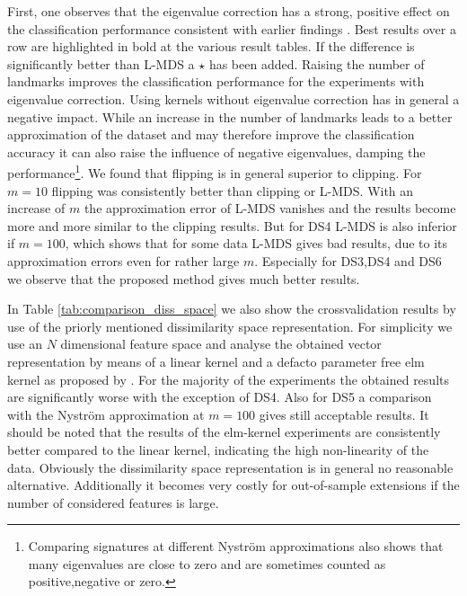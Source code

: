 \documentclass[twoside,11pt]{article}
\begin{document}
First, one observes that the eigenvalue correction has a strong, positive effect
on the classification performance consistent with earlier findings \cite{DBLP:journals/jmlr/ChenGGRC09}. 
Best results over a row are highlighted in bold at the various result tables. If the difference is significantly better than L-MDS
a $\star$ has been added. 
Raising the number of landmarks improves the classification performance for the experiments with eigenvalue correction. 
Using kernels without eigenvalue correction has in general a negative impact. While an increase in the number of landmarks leads to a better
approximation of the dataset and may therefore improve the classification accuracy it can also raise the influence of negative eigenvalues,
damping the performance\footnote{Comparing signatures at different Nystr\"om approximations also shows that many 
eigenvalues are close to zero and are sometimes counted as positive,negative or zero.}. We  found that flipping is in general
superior to clipping. For $m=10$ flipping was consistently better than clipping or L-MDS. With an increase of $m$ the approximation error
of L-MDS vanishes and the results become more and more similar to the clipping results. But for DS4 L-MDS is also inferior if $m=100$,
which shows that for some data L-MDS gives bad results, due to its approximation errors even for rather large $m$.
Especially for DS3,DS4 and DS6 we observe that the proposed method gives much better results.

In Table \ref{tab:comparison_diss_space} we also show the
crossvalidation results by use of the priorly mentioned dissimilarity space representation. For simplicity we use an $N$ dimensional feature space 
and analyse the obtained vector representation by means of a linear kernel and a defacto parameter free elm kernel as proposed by \cite{DBLP:journals/ijon/FrenayV11}.
For the majority of the experiments the obtained results are significantly worse with the exception of DS4. Also for DS5 a comparison with the Nystr\"om
approximation at $m=100$ gives still acceptable results. It should be noted that the results of the elm-kernel experiments are consistently better compared to
the linear kernel, indicating the high non-linearity of the data. Obviously the dissimilarity space representation is in general no reasonable alternative.
Additionally it becomes very costly for out-of-sample extensions if the number of considered features is large.
\end{document}
